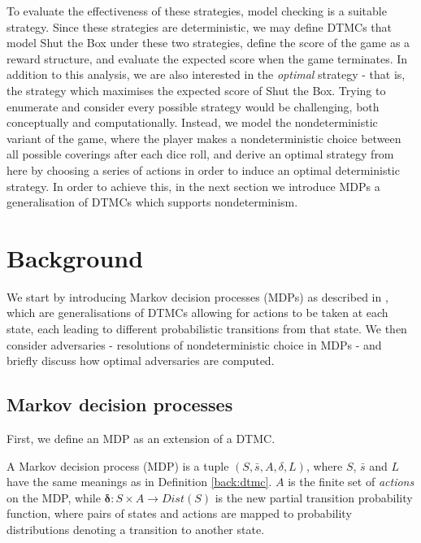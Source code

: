 To evaluate the effectiveness of these strategies, model checking is a suitable strategy. Since these strategies are deterministic, we may define DTMCs that model Shut the Box under these two strategies, define the score of the game as a reward structure, and evaluate the expected score when the game terminates. In addition to this analysis, we are also interested in the \emph{optimal} strategy - that is, the strategy which maximises the expected score of Shut the Box. Trying to enumerate and consider every possible strategy would be challenging, both conceptually and computationally. Instead, we model the nondeterministic variant of the game, where the player makes a nondeterministic choice between all possible coverings after each dice roll, and derive an optimal strategy from here by choosing a series of actions in order to induce an optimal deterministic strategy. In order to achieve this, in the next section we introduce MDPs a generalisation of DTMCs which supports nondeterminism.

\section{Background}
\label{cs1:stb_background}

We start by introducing Markov decision processes (MDPs) as described in \cite{forejt_automated_2011}, which are generalisations of DTMCs allowing for actions to be taken at each state, each leading to different probabilistic transitions from that state. We then consider adversaries - resolutions of nondeterministic choice in MDPs - and briefly discuss how optimal adversaries are computed.

\subsection{Markov decision processes}
\label{cs1:mdps}
First, we define an MDP as an extension of a DTMC.

\begin{definition}
\label{cs1:def_mdps}

A Markov decision process (MDP) is a tuple $(S, \bar{s}, A, \delta, L)$, where $S$, $\bar{s}$ and $L$ have the same meanings as in Definition \ref{back:dtmc}. $A$ is the finite set of \emph{actions} on the MDP, while  $\mathbf{\delta} : S \times A \rightarrow Dist(S)$ is the new partial transition probability function, where pairs of states and actions are mapped to probability distributions denoting a transition to another state.

\end{definition}

